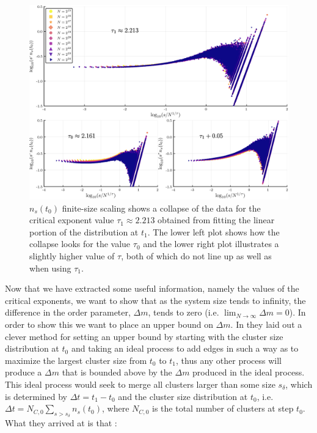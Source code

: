 \begin{figure}[H]
	\centering
	\includegraphics[width=350pt, clip]{images/fss_collapse_triple.png}
	\caption{$n_s(t_0)$ finite-size scaling shows a collapse of the data for the critical exponent value $\tau_1 \approx 2.213$ obtained from fitting the linear portion of the distribution at $t_1$. The lower left plot shows how the collapse looks for the value $\tau_0$ and the lower right plot illustrates a slightly higher value of $\tau$, both of which do not line up as well as when using $\tau_1$.}
	\label{fig:fss_collapse_triple}
\end{figure}

Now that we have extracted some useful information, namely the values of the critical exponents, we want to show that as the system size tends to infinity, the difference in the order parameter, $\Delta m$, tends to zero (i.e. $\lim_{N \rightarrow \infty} \Delta m = 0$).
In order to show this we want to place an upper bound on $\Delta m$. In \cite{Lee_1} they laid out a clever method for setting an upper bound by starting with the cluster size distribution at $t_0$ and taking an ideal process to add edges in such a way as to maximize the largest cluster size from $t_0$ to $t_1$, thus any other process will produce a $\Delta m$ that is bounded above by the $\Delta m$ produced in the ideal process.
This ideal process would seek to merge all clusters larger than some size $s_\delta$, which is determined by $\Delta t = t_1 - t_0$ and the cluster size distribution at $t_0$, i.e. $\Delta t = N_{C, 0} \sum_{s > s_\delta} n_s(t_0)$, where $N_{C, 0}$ is the total number of clusters at step $t_0$.
What they arrived at is that \cite{Lee_1}:

